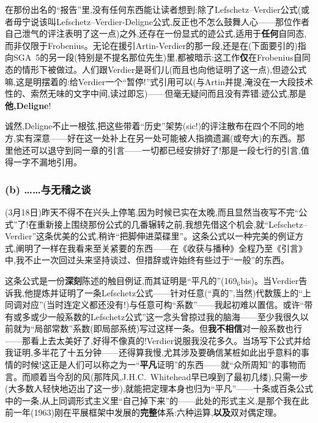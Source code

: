在那份出名的“报告”里,没有任何东西能让读者想到:除了Lefschetz--Verdier公式(或者毋宁说该叫Lefschetz--Verdier-Deligne公式,反正也不怎么鼓舞人心——那位作者自己泄气的评注表明了这一点)之外,还存在一份显式的迹公式,适用于\textbf{任何}自同态,而非仅限于Frobenius。无论在援引Artin-Verdier的那一段,还是在(下面要引的)指向SGA~5的另一段(特别是不提名那位先生)里,都被暗示:这工作\textbf{仅}在Frobenius自同态的情形下被做过。人们跟Verdier是哥们儿(而且也向他证明了这一点),但迹公式嘛,这是明摆着的:给Verdier一个“暂停!”式引用可以(与Artin并提,淹没在一大段技术性的、索然无味的文字中间,读过即忘)——但毫无疑问而且没有弄错:迹公式,那是\textbf{他,Deligne}!

诚然,Deligne不止一根弦,把这些带着“历史”架势(sic!)的评注散布在\dmark{}四个不同的地方,实有深意——好在这一处补上在另一处可能被人指摘遗漏(或夸大)的东西。那里他还可以退守到同一章的引言——一切都已经安排好了!那是一段七行的引言,值得一字不漏地引用。

\subsubsection*{(b) ……与无稽之谈}


(3月18日)昨天不得不在兴头上停笔,因为时候已实在太晚,而且显然当夜写不完“公式”了!在重新接上围绕那份公式的几番辗转之前,我想先借这个机会,就“Lefschetz--Verdier”这条优美的公式,稍许“把脚伸进菜碟里”。这条公式以一种完美的例证方式,阐明了一样在我看来至关紧要的东西——在《收获与播种》全程乃至《引言》中,我不止一次回过头来坚持谈过、但措辞或许始终有些过于“一般”的东西。

这条公式是一份\textbf{深刻}陈述的触目例证,而其证明是“平凡的”(169$_6$bis)。当Verdier告诉我,他提炼并证明了一条Lefschetz公式——针对任意(“真的”,当然)代数簇上的“上同调对应”(当时连定义都还没有!)与任意可构“系数”——我起初难以置信。或许“带有或多或少一般系数的Lefschetz公式”这一念头曾掠过我的脑海——至少我很久以前就为“局部常数”系数(即局部系统)写过这样一条。但\textbf{我不相信}对一般系数也行——那看上去太美好了,好得不像真的!Verdier说服我没花多久。当场写下公式并给我证明,多半花了十五分钟——还得算我慢,尤其涉及要确信某桩如此出乎意料的事情的时候!这正是人们可以称之为一“\textbf{平凡}证明”的东西——就“众所周知”的事物而言。而顺着当今刮的风(那阵风,J.H.C.~Whitehead早已嗅到了最初几缕\dmark{}),只需一步(大多数人轻快地迈出了这一步),就能把定理本身也归为“平凡”——十条或百条公式中的一条,从上同调形式主义里“自己掉下来”的\dmark{}——此处的形式主义,是那个我在此前一年(1963)刚在平展框架中发展的\textbf{完整}体系:六种运算,\textbf{以及}双对偶定理。


